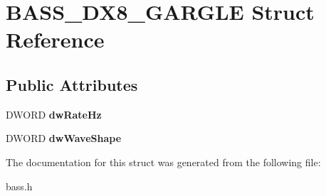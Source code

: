 \section{B\+A\+S\+S\+\_\+\+D\+X8\+\_\+\+G\+A\+R\+G\+L\+E Struct Reference}
\label{struct_b_a_s_s___d_x8___g_a_r_g_l_e}
\subsection*{Public Attributes}
\begin{DoxyCompactItemize}
\item 
D\+W\+O\+R\+D {\bfseries dw\+Rate\+Hz}\label{struct_b_a_s_s___d_x8___g_a_r_g_l_e_a0338a456e4a61784c095203642b3e801}

\item 
D\+W\+O\+R\+D {\bfseries dw\+Wave\+Shape}\label{struct_b_a_s_s___d_x8___g_a_r_g_l_e_aca685edf6d4938d62830ce4a834f0e28}

\end{DoxyCompactItemize}


The documentation for this struct was generated from the following file\+:\begin{DoxyCompactItemize}
\item 
bass.\+h\end{DoxyCompactItemize}
